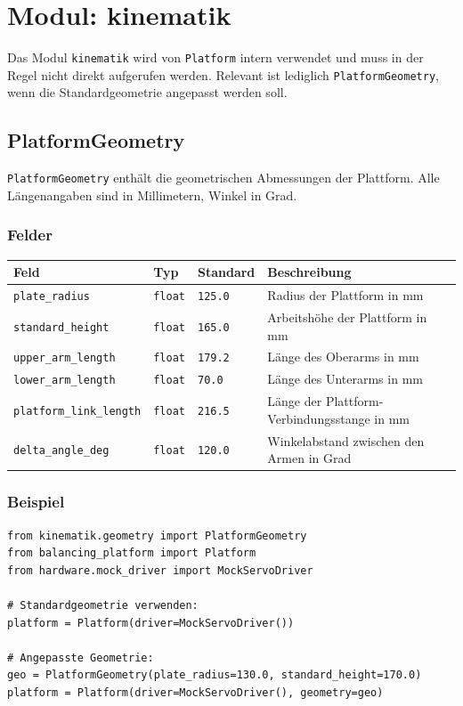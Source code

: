\documentclass[11pt, a4paper]{scrreprt}
\begin{document}
\chapter{Modul: kinematik}

Das Modul \texttt{kinematik} wird von \texttt{Platform} intern verwendet
und muss in der Regel nicht direkt aufgerufen werden.
Relevant ist lediglich \texttt{PlatformGeometry}, wenn die Standardgeometrie
angepasst werden soll.

\section{PlatformGeometry}

\texttt{PlatformGeometry} enthält die geometrischen Abmessungen der Plattform.
Alle Längenangaben sind in Millimetern, Winkel in Grad.

\subsection*{Felder}

\begin{tabularx}{\textwidth}{l l l X}
  \toprule
  Feld & Typ & Standard & Beschreibung \\
  \midrule
  \texttt{plate\_radius} & \texttt{float} & \texttt{125.0} & Radius der Plattform in mm \\
  \texttt{standard\_height} & \texttt{float} & \texttt{165.0} & Arbeitshöhe der Plattform in mm \\
  \texttt{upper\_arm\_length} & \texttt{float} & \texttt{179.2} & Länge des Oberarms in mm \\
  \texttt{lower\_arm\_length} & \texttt{float} & \texttt{70.0} & Länge des Unterarms in mm \\
  \texttt{platform\_link\_length} & \texttt{float} & \texttt{216.5} & Länge der Plattform-Verbindungsstange in mm \\
  \texttt{delta\_angle\_deg} & \texttt{float} & \texttt{120.0} & Winkelabstand zwischen den Armen in Grad \\
  \bottomrule
\end{tabularx}

\subsection*{Beispiel}

\begin{lstlisting}
from kinematik.geometry import PlatformGeometry
from balancing_platform import Platform
from hardware.mock_driver import MockServoDriver

# Standardgeometrie verwenden:
platform = Platform(driver=MockServoDriver())

# Angepasste Geometrie:
geo = PlatformGeometry(plate_radius=130.0, standard_height=170.0)
platform = Platform(driver=MockServoDriver(), geometry=geo)
\end{lstlisting}
\end{document}
